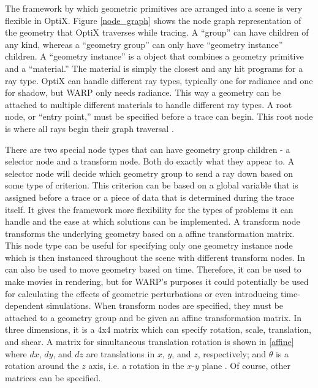 The framework by which geometric primitives are arranged into a scene is very flexible in OptiX.  Figure \ref{node_graph} shows the node graph representation of the geometry that OptiX traverses while tracing.   A ``group'' can have children of any kind, whereas a ``geometry group'' can only have ``geometry instance'' children.  A ``geometry instance'' is a object that combines a geometry primitive and a ``material.''  The material is simply the closest and any hit programs for a ray type.  OptiX can handle different ray types, typically one for radiance and one for shadow, but WARP only needs radiance.  This way a geometry can be attached to multiple different materials to handle different ray types.  A root node, or ``entry point,'' must be specified before a trace can begin.  This root node is where all rays begin their graph traversal \cite{optix}.

There are two special node types that can have geometry group children - a selector node and a transform node.  Both do exactly what they appear to.  A selector node will decide which geometry group to send a ray down based on some type of criterion.  This criterion can be based on a  global variable that is assigned before a trace or a piece of data that is determined during the trace itself.  It gives the framework more flexibility for the types of problems it can handle and the ease at which solutions can be implemented.  A transform node transforms the underlying geometry based on a affine transformation matrix.  This node type can be useful for specifying only one geometry instance node which is then instanced throughout the scene with different transform nodes.  In can also be used to move geometry based on time.  Therefore, it can be used to make movies in rendering, but for WARP's purposes it could potentially be used for calculating the effects of geometric perturbations or even introducing time-dependent simulations.  When transform nodes are specified, they must be attached to a geometry group and be given an affine transformation matrix.  In three dimensions, it is a 4x4 matrix which can specify rotation, scale, translation, and shear.  A matrix for simultaneous translation rotation is shown in \eqref{affine} where $dx$, $dy$, and $dz$ are translations in $x$, $y$, and $z$, respectively; and $\theta$ is a rotation around the $z$ axis, i.e. a rotation in the $x$-$y$ plane \cite{affine}.  Of course, other matrices can be specified.

